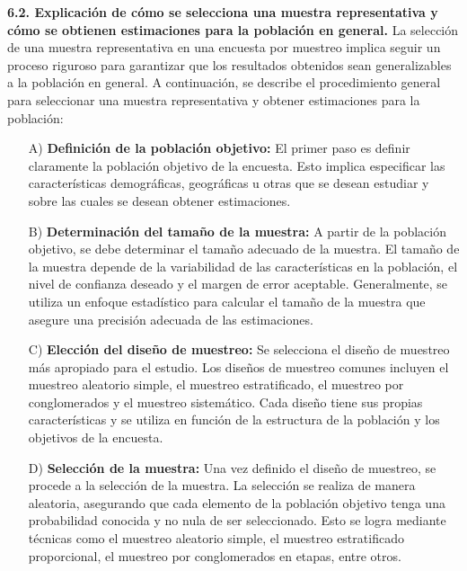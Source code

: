 \documentclass[8pt,a4paper]{beamer}
\begin{document}
{\begin{frame}{}
\begin{block}{\textbf{6.2. Explicación de cómo se selecciona una muestra representativa y cómo se obtienen estimaciones para la población en general.}}
\justifying
La selección de una muestra representativa en una encuesta por muestreo implica seguir un proceso riguroso para garantizar que los resultados obtenidos sean generalizables a la población en general. A continuación, se describe el procedimiento general para seleccionar una muestra representativa y obtener estimaciones para la población:
\begin{enumerate}
\justifying
\item[A)] \textbf{Definición de la población objetivo:} El primer paso es definir claramente la población objetivo de la encuesta. Esto implica especificar las características demográficas, geográficas u otras que se desean estudiar y sobre las cuales se desean obtener estimaciones.
\item[B)] \textbf{Determinación del tamaño de la muestra:} A partir de la población objetivo, se debe determinar el tamaño adecuado de la muestra. El tamaño de la muestra depende de la variabilidad de las características en la población, el nivel de confianza deseado y el margen de error aceptable. Generalmente, se utiliza un enfoque estadístico para calcular el tamaño de la muestra que asegure una precisión adecuada de las estimaciones.
\end{enumerate}
\end{block}
\end{frame}

\begin{frame}{}
\begin{block}{}
\justifying
\begin{enumerate}
\justifying
\item[C)] \textbf{Elección del diseño de muestreo:} Se selecciona el diseño de muestreo más apropiado para el estudio. Los diseños de muestreo comunes incluyen el muestreo aleatorio simple, el muestreo estratificado, el muestreo por conglomerados y el muestreo sistemático. Cada diseño tiene sus propias características y se utiliza en función de la estructura de la población y los objetivos de la encuesta.
\item[D)] \textbf{Selección de la muestra:} Una vez definido el diseño de muestreo, se procede a la selección de la muestra. La selección se realiza de manera aleatoria, asegurando que cada elemento de la población objetivo tenga una probabilidad conocida y no nula de ser seleccionado. Esto se logra mediante técnicas como el muestreo aleatorio simple, el muestreo estratificado proporcional, el muestreo por conglomerados en etapas, entre otros.


\end{enumerate}
\end{block}
\end{frame}}
\end{document}

